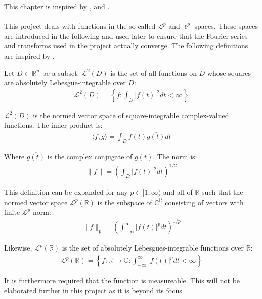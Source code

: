 This chapter is inspired by \cite{FAA}, \cite{FSP} and \cite{FTFA}.
\\ \\
This project deals with functions in the so-called $\mathcal{L}^p$ and $\ell^p$ spaces. These spaces are introduced in the following and used later to ensure that the Fourier series and transforms used in the project actually converge. The following definitions are inspired by \cite{page 31, FSP}.

\begin{definition}

Let $D \subset \mathbb{R}^n$ be a subset. $\mathcal{L}^2(D)$ is the set of all functions on $D$ whose squares are absolutely Lebesgue-integrable over $D$:
\begin{align*}
\mathcal{L}^2(D) = \left\{ f: \int_D |f(t)|^2 dt < \infty \right\}
\end{align*}

$\mathcal{L}^2(D)$ is the normed vector space of square-integrable complex-valued functions. The inner product is:
\begin{align*}
\langle f,g \rangle =  \int_D f(t) \overline{g(t)} dt
\end{align*}

Where $\overline{g(t)}$ is the complex conjugate of $g(t)$. The norm is:
\begin{align*}
\|f\| = \left( \int_D |f(t)|^2 dt \right)^{1/2}
\end{align*}

This definition can be expanded for any $p \in [1,\infty)$ and all of $\mathbb{R}$ such that the normed vector space $\mathcal{L}^p(\mathbb{R})$ is the subspace of $\mathbb{C}^\mathbb{R}$ consisting of vectors with finite $\mathcal{L}^p$ norm:
\begin{align*}
\|f\|_p = \left( \int_{-\infty}^\infty |f(t)|^p dt \right)^{1/p}
\end{align*}

Likewise, $\mathcal{L}^p(\mathbb{R})$ is the set of absolutely Lebesgues-integrable functions over $\mathbb{R}$:
\begin{align*}
\mathcal{L}^p(\mathbb{R}) = \left\{ f: \mathbb{R} \to \mathbb{C}: \int_{-\infty}^\infty |f(t)|^p dt < \infty \right\}
\end{align*}

It is furthermore required that the function is measureable. This will not be elaborated further in this project as it is beyond its focus.
\end{definition}

